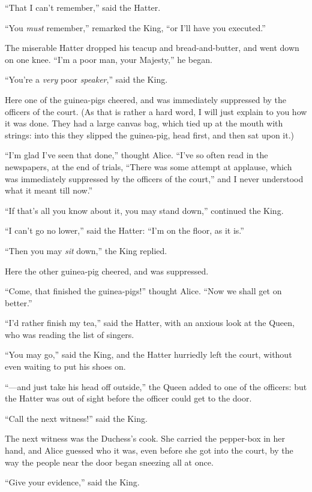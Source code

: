 \documentclass[11pt,openany,oneside]{book}
\begin{document}
“That I can’t remember,” said the Hatter. 

“You {\em must\/} remember,” remarked the King, “or I’ll have you executed.” 

The miserable Hatter dropped his teacup and bread-and-butter, and went down on one knee. “I’m a poor man, your Majesty,” he began. 

“You’re a {\em very\/} poor {\em speaker\/},” said the King. 

Here one of the guinea-pigs cheered, and was immediately suppressed by the officers of the court. (As that is rather a hard word, I will just explain to you how it was done. They had a large canvas bag, which tied up at the mouth with strings: into this they slipped the guinea-pig, head first, and then sat upon it.) 

“I’m glad I’ve seen that done,” thought Alice. “I’ve so often read in the newspapers, at the end of trials, “There was some attempt at applause, which was immediately suppressed by the officers of the court,” and I never understood what it meant till now.” 

“If that’s all you know about it, you may stand down,” continued the King. 

“I can’t go no lower,” said the Hatter: “I’m on the floor, as it is.” 

“Then you may {\em sit\/} down,” the King replied. 

Here the other guinea-pig cheered, and was suppressed. 

“Come, that finished the guinea-pigs!” thought Alice. “Now we shall get on better.” 

“I’d rather finish my tea,” said the Hatter, with an anxious look at the Queen, who was reading the list of singers. 

“You may go,” said the King, and the Hatter hurriedly left the court, without even waiting to put his shoes on. 

“—and just take his head off outside,” the Queen added to one of the officers: but the Hatter was out of sight before the officer could get to the door. 

“Call the next witness!” said the King. 

The next witness was the Duchess’s cook. She carried the pepper-box in her hand, and Alice guessed who it was, even before she got into the court, by the way the people near the door began sneezing all at once. 

“Give your evidence,” said the King. 
\end{document}
